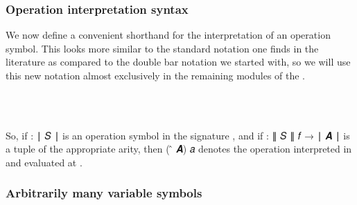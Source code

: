 \subsubsection{Operation interpretation syntax}\label{operation-interpretation-syntax}

We now define a convenient shorthand for the interpretation of an operation symbol. This looks more similar to the standard notation one finds in the literature as compared to the double bar notation we started with, so we will use this new notation almost exclusively in the remaining modules of the \ualib.
\ccpad
\begin{code}%
\>[1]\AgdaSpace{}%
\AgdaSymbol{:}\AgdaSpace{}%
\AgdaSymbol{(}\AgdaSpace{}%
\AgdaSymbol{:}\AgdaSpace{}%
\AgdaSpace{}%
\AgdaSpace{}%
\AgdaSymbol{)(}\AgdaSpace{}%
\AgdaSymbol{:}\AgdaSpace{}%
\AgdaSpace{}%
\AgdaSpace{}%
\AgdaSymbol{)}\AgdaSpace{}%
\AgdaSpace{}%
\AgdaSymbol{(}\AgdaSpace{}%
\AgdaSpace{}%
\AgdaSpace{}%
%
\>[48]%
\>[51]\AgdaSpace{}%
\AgdaSpace{}%
\AgdaSymbol{)}\AgdaSpace{}%
\AgdaSpace{}%
\AgdaSpace{}%
\AgdaSpace{}%
\<%
\\
%
\\[\AgdaEmptyExtraSkip]%
%
\>[1]\AgdaSpace{}%
\AgdaSpace{}%
\AgdaSpace{}%
\AgdaSymbol{=}\AgdaSpace{}%
\AgdaSpace{}%
\AgdaSpace{}%
\AgdaSpace{}%
\AgdaSymbol{(}\AgdaSpace{}%
\AgdaSpace{}%
\AgdaSpace{}%
\AgdaSymbol{)}\AgdaSpace{}%
\<%
\end{code}
\ccpad
So, if  \as : \af ∣ \ab 𝑆 \af ∣ is an operation symbol in the signature , and if  \as : \af ∥ \ab 𝑆 \af ∥ \ab 𝑓 \as → \af ∣ \ab 𝑨 \af ∣ is a tuple of the appropriate arity, then ( \af ̂ \ab 𝑨) \ab 𝑎 denotes the operation  interpreted in  and evaluated at .

\subsubsection{Arbitrarily many variable symbols}\label{arbitrarily-many-variable-symbols}

